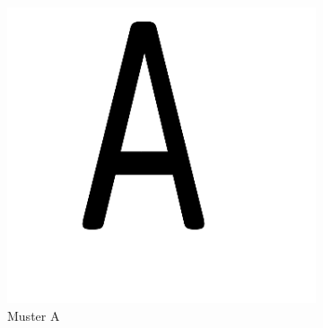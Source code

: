 \begin{figure}[H]
\begin{subfigure}{0.35\textwidth}
\includegraphics[width=0.95\linewidth]{assets/informatik-prototyp/opencv/target_node_detection/a.png} 
\caption{Muster A}
\label{fig:image-a}
\end{subfigure}
\begin{subfigure}{0.2\textwidth}

\end{subfigure}
\end{figure}
